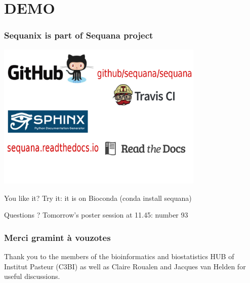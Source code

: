 \documentclass{beamer}
\begin{document}
\section{DEMO}



\begin{frame}
\frametitle{Sequanix is part of Sequana project}
\centering
\includegraphics[scale=0.3, height=7cm]{images/logo.png}

\end{frame}

\begin{frame}

\begin{block}{You like it?}
 Try it: it is on Bioconda (conda install sequana)
\end{block}

\begin{block}{Questions ?}
Tomorrow's poster session at 11.45: number 93
\end{block}

\end{frame}

\begin{frame}
\frametitle{Merci gramint à vouzotes}
Thank you to the members of the bioinformatics and biostatistics HUB of 
Institut Pasteur (C3BI) as well as  Claire Roualen and Jacques van Helden for useful 
discussions.


\end{frame}
\end{document}
